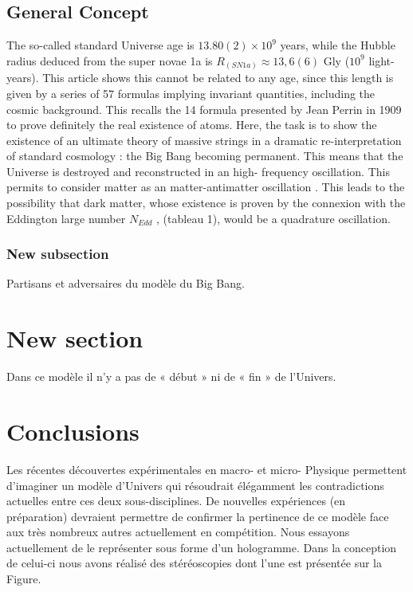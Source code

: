 \documentclass[a4paper,9pt]{article}
\begin{document}
\subsection{General Concept}
The so-called standard Universe age is $13.80(2) \times 10^9$ years, while the Hubble radius deduced
from the super novae 1a is $R_{(SN1a)} \approx 13,6(6)$ Gly ($10^9$ light-years). This article shows this cannot be
related to any age, since this length is given by a series of 57 formulas implying invariant quantities,
including the cosmic background. This recalls the 14 formula presented by Jean Perrin in 1909 to
prove definitely the real existence of atoms. Here, the task is to show the existence of an ultimate
theory of massive strings in a dramatic re-interpretation of standard cosmology : the Big Bang
becoming permanent. This means that the Universe is destroyed and reconstructed in an high-
frequency oscillation. This permits to consider matter as an matter-antimatter oscillation \cite{Sanchez2}. This
leads to the possibility that dark matter, whose existence is proven by the connexion with the
Eddington large number $N_{Edd}$ , (tableau 1), would be a quadrature oscillation.

\subsubsection{New subsection}

Partisans et adversaires du modèle du Big Bang.

\section{New section}
\label{sec:headings}

Dans ce modèle il n'y a pas de « début » ni de « fin » de l'Univers.


\section{Conclusions}
\label{sec:headings}

Les récentes découvertes expérimentales en macro- et micro- Physique permettent d'imaginer un modèle d'Univers qui résoudrait élégamment les contradictions actuelles entre ces deux sous-disciplines. De nouvelles expériences (en préparation) devraient permettre de confirmer la pertinence de ce modèle face aux très nombreux autres actuellement en compétition. Nous essayons actuellement de le représenter sous forme d'un hologramme. Dans la conception de celui-ci nous avons réalisé des stéréoscopies dont l'une est présentée sur la Figure.
\end{document}
